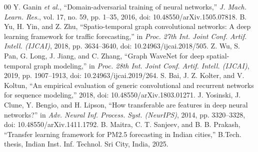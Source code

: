 \documentclass[journal]{IEEEtran}
\begin{document}
\begin{thebibliography}{00}
 Y. Ganin \emph{et al.}, ``Domain-adversarial training of neural networks,'' \emph{J. Mach. Learn. Res.}, vol. 17, no. 59, pp. 1--35, 2016, doi: 10.48550/arXiv.1505.07818.
 B. Yu, H. Yin, and Z. Zhu, ``Spatio-temporal graph convolutional networks: A deep learning framework for traffic forecasting,'' in \emph{Proc. 27th Int. Joint Conf. Artif. Intell. (IJCAI)}, 2018, pp. 3634--3640, doi: 10.24963/ijcai.2018/505.
 Z. Wu, S. Pan, G. Long, J. Jiang, and C. Zhang, ``Graph WaveNet for deep spatial-temporal graph modeling,'' in \emph{Proc. 28th Int. Joint Conf. Artif. Intell. (IJCAI)}, 2019, pp. 1907--1913, doi: 10.24963/ijcai.2019/264.
 S. Bai, J. Z. Kolter, and V. Koltun, ``An empirical evaluation of generic convolutional and recurrent networks for sequence modeling,'' 2018, doi: 10.48550/arXiv.1803.01271.
 J. Yosinski, J. Clune, Y. Bengio, and H. Lipson, ``How transferable are features in deep neural networks?'' in \emph{Adv. Neural Inf. Process. Syst. (NeurIPS)}, 2014, pp. 3320--3328, doi: 10.48550/arXiv.1411.1792.
 B. Maitra, C. T. Sanjeev, and B. B. Prakash, ``Transfer learning framework for PM2.5 forecasting in Indian cities,'' B.Tech. thesis, Indian Inst. Inf. Technol. Sri City, India, 2025.
\end{thebibliography}
\end{document}
